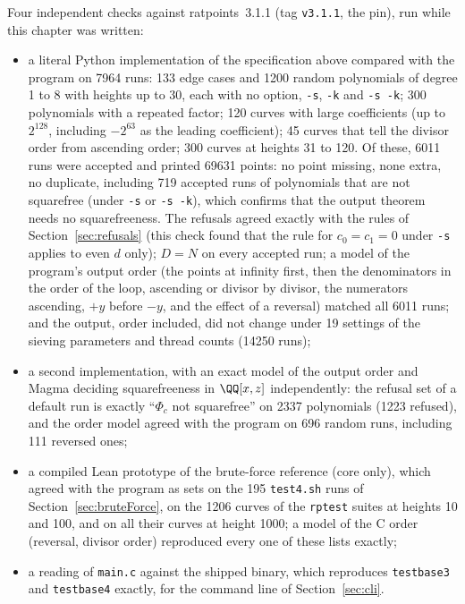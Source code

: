 Four independent checks against ratpoints~3.1.1 (tag \verb|v3.1.1|, the pin), run while this
chapter was written:
\begin{itemize}
  \item a literal Python implementation of the specification above compared with the program on
    7964 runs: 133 edge cases and 1200 random polynomials of degree 1 to 8 with heights up to 30,
    each with no option, \verb|-s|, \verb|-k| and \verb|-s -k|; 300 polynomials with a repeated
    factor; 120 curves with large coefficients (up to $2^{128}$, including $-2^{63}$ as the
    leading coefficient); 45 curves that tell the divisor order from ascending order; 300 curves
    at heights 31 to 120. Of these, 6011 runs were accepted and printed 69631 points: no point
    missing, none extra, no duplicate, including 719 accepted runs of polynomials that are not
    squarefree (under \verb|-s| or \verb|-s -k|), which confirms that the output theorem needs no
    squarefreeness. The refusals agreed exactly with the rules of Section~\ref{sec:refusals} (this
    check found that the rule for $c_0 = c_1 = 0$ under \verb|-s| applies to even $d$ only);
    $D = N$ on every accepted run; a model of the program's output order (the points at infinity
    first, then the denominators in the order of the loop, ascending or divisor by divisor, the
    numerators ascending, $+y$ before $-y$, and the effect of a reversal) matched all 6011 runs;
    and the output, order included, did not change under 19 settings of the sieving parameters
    and thread counts (14250 runs);
  \item a second implementation, with an exact model of the output order and Magma deciding
    squarefreeness in $\QQ[x, z]$ independently: the refusal set of a default run is exactly
    ``$\Phi_c$ not squarefree'' on 2337 polynomials (1223 refused), and the order model agreed
    with the program on 696 random runs, including 111 reversed ones;
  \item a compiled Lean prototype of the brute-force reference (core only), which agreed with
    the program as sets on the 195 \verb|test4.sh| runs of Section~\ref{sec:bruteForce}, on the
    1206 curves of the \verb|rptest| suites at heights 10 and 100, and on all their curves at
    height 1000; a model of the C order (reversal, divisor order) reproduced every one of these
    lists exactly;
  \item a reading of \verb|main.c| against the shipped binary, which reproduces \verb|testbase3|
    and \verb|testbase4| exactly, for the command line of Section~\ref{sec:cli}.
\end{itemize}
